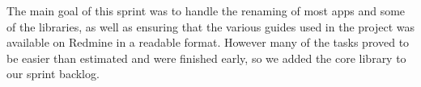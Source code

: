 The main goal of this sprint was to handle the renaming of most apps and some of the libraries, as well as ensuring that the various guides used in the project was available on Redmine in a readable format. However many of the tasks proved to be easier than estimated and were finished early, so we added the core library to our sprint backlog.\\
\newpage